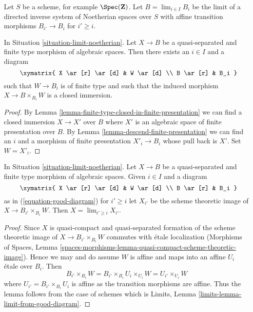 \begin{situation}
\label{situation-limit-noetherian}
Let $S$ be a scheme, for example $\Spec(\mathbf{Z})$.
Let $B = \lim_{i \in I} B_i$ be the limit
of a directed inverse system of Noetherian spaces over $S$
with affine transition morphisms
$B_{i'} \to B_i$ for $i' \geq i$.
\end{situation}

\begin{lemma}
\label{lemma-good-diagram}
In Situation \ref{situation-limit-noetherian}.
Let $X \to B$ be a quasi-separated and finite type
morphism of algebraic spaces.
Then there exists an $i \in I$ and a diagram
\begin{equation}
\label{equation-good-diagram}
\vcenter{
\xymatrix{
X \ar[r] \ar[d] & W \ar[d] \\
B \ar[r] & B_i
}
}
\end{equation}
such that $W \to B_i$ is of finite type and such that
the induced morphism $X \to B \times_{B_i} W$ is a closed
immersion.
\end{lemma}

\begin{proof}
By Lemma \ref{lemma-finite-type-closed-in-finite-presentation}
we can find a closed immersion $X \to X'$
over $B$ where $X'$ is an algebraic space of finite presentation over $B$.
By Lemma \ref{lemma-descend-finite-presentation}
we can find an $i$ and a morphism of finite presentation
$X'_i \to B_i$ whose pull back is $X'$. Set $W = X'_i$.
\end{proof}

\begin{lemma}
\label{lemma-limit-from-good-diagram}
In Situation \ref{situation-limit-noetherian}.
Let $X \to B$ be a quasi-separated and finite type morphism
of algebraic spaces. Given $i \in I$ and a diagram
$$
\vcenter{
\xymatrix{
X \ar[r] \ar[d] & W \ar[d] \\
B \ar[r] & B_i
}
}
$$
as in (\ref{equation-good-diagram}) for $i' \geq i$ let
$X_{i'}$ be the scheme theoretic image of $X \to B_{i'} \times_{B_i} W$.
Then $X = \lim_{i' \geq i} X_{i'}$.
\end{lemma}

\begin{proof}
Since $X$ is quasi-compact and quasi-separated formation of the
scheme theoretic image of $X \to B_{i'} \times_{B_i} W$
commutes with \'etale localization
(Morphisms of Spaces, Lemma
\ref{spaces-morphisms-lemma-quasi-compact-scheme-theoretic-image}).
Hence we may and do assume $W$ is affine and maps into an affine
$U_i$ \'etale over $B_i$. Then
$$
B_{i'} \times_{B_i} W =
B_{i'} \times_{B_i} U_i \times_{U_i} W =
U_{i'} \times_{U_i} W
$$
where $U_{i'} = B_{i'} \times_{B_i} U_i$ is affine as the transition
morphisms are affine. Thus the lemma follows from the case of schemes
which is
Limits, Lemma \ref{limits-lemma-limit-from-good-diagram}.
\end{proof}

